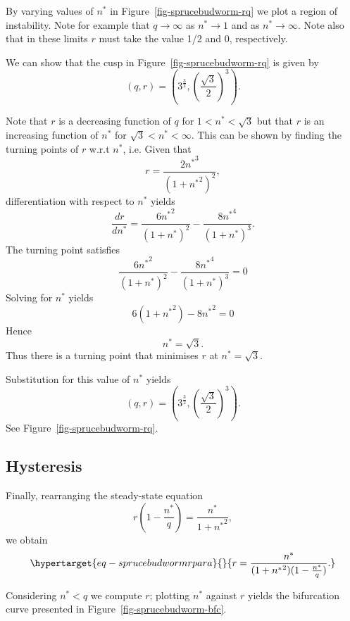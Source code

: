 \documentclass[
  letterpaper,
  DIV=11,
  numbers=noendperiod]{scrreprt}
\begin{document}
By varying values of \(n^*\) in Figure~\ref{fig-sprucebudworm-rq} we
plot a region of instability. Note for example that
\(q\rightarrow \infty\) as \(n^*\rightarrow 1\) and as
\(n^*\rightarrow \infty\). Note also that in these limits \(r\) must
take the value 1/2 and 0, respectively.

We can show that the cusp in Figure~\ref{fig-sprucebudworm-rq} is given
by \[
\left(q,r\right)=\left(3^{\frac{3}{2}},\left(\frac{\sqrt{3}}{2}\right)^3\right).
\]

Note that \(r\) is a decreasing function of \(q\) for \(1<n^*<\sqrt{3}\)
but that \(r\) is an increasing function of \(n^*\) for
\(\sqrt{3}<n^*<\infty\). This can be shown by finding the turning points
of \(r\) w.r.t \(n^*\), i.e. Given that \[
r=\frac{2n{^*}^{3}}{(1+n{^*}^{2})^2},
\] differentiation with respect to \(n^*\) yields \[
\frac{dr}{dn^*}=\frac{6{n^*}^2}{(1+n^*)^2} - \frac{8n{^*}^4}{(1+n^*)^3}.
\] The turning point satisfies \[
\frac{6{n^*}^2}{(1+n^*)^2} - \frac{8n{^*}^4}{(1+n^*)^3}=0
\] Solving for \(n^*\) yields \[
6(1+{n^*}^2) - 8n{^*}^2=0 
\] Hence \[
  n^*=\sqrt{3}.
\] Thus there is a turning point that minimises \(r\) at
\(n^*=\sqrt{3}\).

Substitution for this value of \(n^*\) yields \[
\left(q,r\right)=\left(3^{\frac{3}{2}},\left(\frac{\sqrt{3}}{2}\right)^3\right).
\] See Figure~\ref{fig-sprucebudworm-rq}.

\hypertarget{hysteresis}{%
\subsection{Hysteresis}\label{hysteresis}}

Finally, rearranging the steady-state equation \[
  r(1-\frac{n^*}{q}) = \frac{n^*}{1+n{^*}^{2}},
 \] we obtain
\begin{equation}\protect\hypertarget{eq-sprucebudwormrpara}{}{ 
   r = \frac{n^*}{(1+n{^*}^{2})(1-\frac{n^*}{q})}.
}\label{eq-sprucebudwormrpara}\end{equation}

Considering \(n^*<q\) we compute \(r\); plotting \(n^*\) against \(r\)
yields the bifurcation curve presented in
Figure~\ref{fig-sprucebudworm-bfc}.
\end{document}
